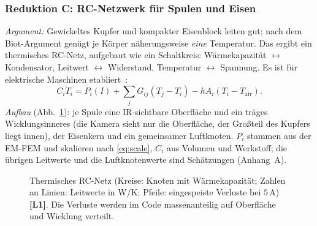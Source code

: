 \documentclass[a4paper, 10pt, conference]{ieeeconf}
\theoremstyle{remark}
\newcommand{\src}[1]{\,\textbf{[#1]}}
\begin{document}
\subsubsection{Reduktion C: RC-Netzwerk für Spulen und Eisen}
\emph{Argument:} Gewickeltes Kupfer und kompakter Eisenblock leiten gut;
nach dem Biot-Argument genügt je Körper näherungsweise \emph{eine}
Temperatur. Das ergibt ein thermisches RC-Netz, aufgebaut wie ein
Schaltkreis: Wärmekapazität $\leftrightarrow$ Kondensator, Leitwert
$\leftrightarrow$ Widerstand, Temperatur $\leftrightarrow$ Spannung. Es ist
für elektrische Maschinen etabliert~\cite{wallscheid2021thermal}:
\begin{equation}
  C_i\dot T_i=P_i(I)+\sum_jG_{ij}(T_j-T_i)-hA_i(T_i-T_{\mathrm{air}}).
  \label{eq:rc}
\end{equation}
\emph{Aufbau} (Abb.~\ref{fig:rc}): je Spule eine IR-sichtbare Oberfläche
und ein träges Wicklungsinneres (die Kamera sieht nur die Oberfläche, der
Großteil des Kupfers liegt innen), der Eisenkern und ein gemeinsamer
Luftknoten. $P_i$ stammen aus der EM-FEM und skalieren nach
\eqref{eq:scale}, $C_i$ aus Volumen und Werkstoff; die übrigen Leitwerte
und die Luftknotenwerte sind Schätzungen (Anhang~A).

\begin{figure}[t]
\centering
{}
\caption{Thermisches RC-Netz (Kreise: Knoten mit Wärmekapazität; Zahlen an
Linien: Leitwerte in W/K; Pfeile: eingespeiste Verluste bei $5\,$A)\src{L1}.
Die Verluste werden im Code massenanteilig auf Oberfläche und Wicklung verteilt.}
\label{fig:rc}
\end{figure}
\end{document}
